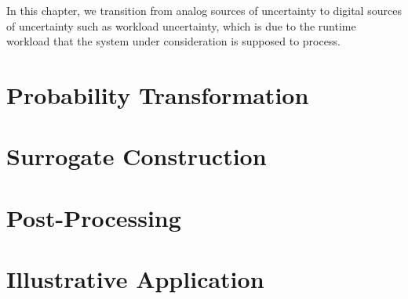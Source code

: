 In this chapter, we transition from analog sources of uncertainty to digital
sources of uncertainty such as workload uncertainty, which is due to the runtime
workload that the system under consideration is supposed to process.

\section{\introductiontitle}

\section{\motivationtitle}

\section{\problemtitle}

\section{\priortitle}

\section{\solutiontitle}

\section{Probability Transformation}

\section{Surrogate Construction}

\section{Post-Processing}

\section{Illustrative Application}

\section{\resultstitle}

\section{\conclusiontitle}
